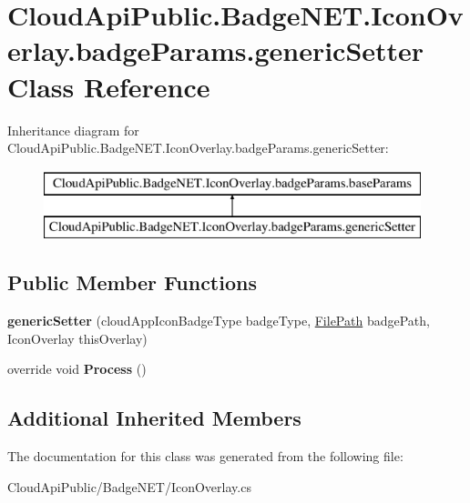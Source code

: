 \hypertarget{class_cloud_api_public_1_1_badge_n_e_t_1_1_icon_overlay_1_1badge_params_1_1generic_setter}{\section{Cloud\-Api\-Public.\-Badge\-N\-E\-T.\-Icon\-Overlay.\-badge\-Params.\-generic\-Setter Class Reference}
\label{class_cloud_api_public_1_1_badge_n_e_t_1_1_icon_overlay_1_1badge_params_1_1generic_setter}
}
Inheritance diagram for Cloud\-Api\-Public.\-Badge\-N\-E\-T.\-Icon\-Overlay.\-badge\-Params.\-generic\-Setter\-:\begin{figure}[H]
\begin{center}
\leavevmode
\includegraphics[height=2.000000cm]{class_cloud_api_public_1_1_badge_n_e_t_1_1_icon_overlay_1_1badge_params_1_1generic_setter}
\end{center}
\end{figure}
\subsection*{Public Member Functions}
\begin{DoxyCompactItemize}
\item 
\hypertarget{class_cloud_api_public_1_1_badge_n_e_t_1_1_icon_overlay_1_1badge_params_1_1generic_setter_a358847062f58dd892194869e0f9d8f56}{{\bfseries generic\-Setter} (cloud\-App\-Icon\-Badge\-Type badge\-Type, \hyperlink{class_cloud_api_public_1_1_model_1_1_file_path}{File\-Path} badge\-Path, Icon\-Overlay this\-Overlay)}\label{class_cloud_api_public_1_1_badge_n_e_t_1_1_icon_overlay_1_1badge_params_1_1generic_setter_a358847062f58dd892194869e0f9d8f56}

\item 
\hypertarget{class_cloud_api_public_1_1_badge_n_e_t_1_1_icon_overlay_1_1badge_params_1_1generic_setter_a119f96b8cfc81af0fb79d76b11447276}{override void {\bfseries Process} ()}\label{class_cloud_api_public_1_1_badge_n_e_t_1_1_icon_overlay_1_1badge_params_1_1generic_setter_a119f96b8cfc81af0fb79d76b11447276}

\end{DoxyCompactItemize}
\subsection*{Additional Inherited Members}


The documentation for this class was generated from the following file\-:\begin{DoxyCompactItemize}
\item 
Cloud\-Api\-Public/\-Badge\-N\-E\-T/Icon\-Overlay.\-cs\end{DoxyCompactItemize}
